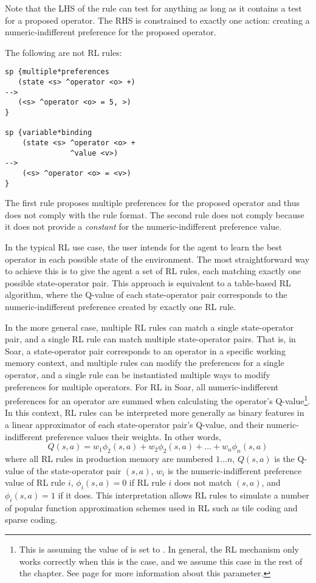 Note that the LHS of the rule can test for anything as long as it contains a test for a proposed operator.
The RHS is constrained to exactly one action: creating a numeric-indifferent preference for the proposed operator.

The following are not RL rules:

\begin{verbatim}
sp {multiple*preferences
   (state <s> ^operator <o> +)
-->
   (<s> ^operator <o> = 5, >)
}

sp {variable*binding
    (state <s> ^operator <o> +
               ^value <v>)
-->
    (<s> ^operator <o> = <v>)
}
\end{verbatim}

The first rule proposes multiple preferences for the proposed operator and thus does not comply with the rule format.
The second rule does not comply because it does not provide a \emph{constant} for the numeric-indifferent preference value.

In the typical RL use case, the user intends for the agent to learn the best operator in each possible state of the environment.
The most straightforward way to achieve this is to give the agent a set of RL rules, each matching exactly one possible state-operator pair.
This approach is equivalent to a table-based RL algorithm, where the Q-value of each state-operator pair corresponds to the numeric-indifferent preference created by exactly one RL rule.

In the more general case, multiple RL rules can match a single state-operator pair, and a single RL rule can match multiple state-operator pairs.
That is, in Soar, a state-operator pair corresponds to an operator in a specific working memory context, and multiple rules can modify the preferences for a single operator, and a single rule can be instantiated multiple ways to modify preferences for multiple operators.
For RL in Soar, all numeric-indifferent preferences for an operator are summed when calculating the operator's Q-value\footnote{
This is assuming the value of  is set to .
In general, the RL mechanism only works correctly when this is the case, and we assume this case in the rest of the chapter.
See page \pageref{decide-numeric-indifferent-mode} for more information about this parameter.}.
In this context, RL rules can be interpreted more generally as binary features in a linear approximator of each state-operator pair's Q-value, and their numeric-indifferent preference values their weights.
In other words,
$$Q(s, a) = w_1 \phi_2 (s, a) + w_2 \phi_2 (s, a) + \ldots + w_n \phi_n (s, a)$$
where all RL rules in production memory are numbered $1 \dots n$, $Q(s, a)$ is the Q-value of the state-operator pair $(s, a)$, $w_i$ is the numeric-indifferent preference value of RL rule $i$, $\phi_i (s, a) = 0$ if RL rule $i$ does not match $(s, a)$, and $\phi_i (s, a) = 1$ if it does.
This interpretation allows RL rules to simulate a number of popular function approximation schemes used in RL such as tile coding and sparse coding.

